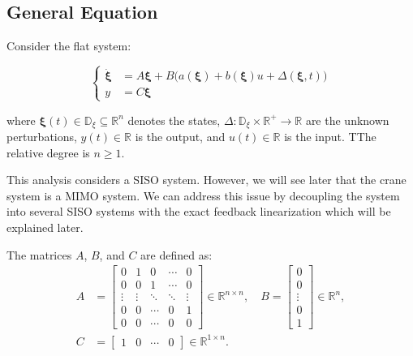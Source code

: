 \subsection{General Equation}

Consider the flat system:

\begin{equation}
    \label{eq:flat_sys_reduced1}
    \left\{
        \begin{aligned}
            \dot{\boldsymbol{\xi}} &= A\boldsymbol{\xi} + B\big(a(\boldsymbol{\xi}) + b(\boldsymbol{\xi})u + \Delta(\boldsymbol{\xi}, t) \big) \\
            y &= C\boldsymbol{\xi}
        \end{aligned}
    \right.
\end{equation}

where \(\boldsymbol{\xi}(t) \in \mathbb{D}_\xi \subseteq \mathbb{R}^n\) denotes the states, 
\(\Delta: \mathbb{D}_{\xi} \times \mathbb{R}^+ \rightarrow \mathbb{R}\) are the unknown 
perturbations, \(y(t) \in \mathbb{R}\) is the output, and \(u(t) \in \mathbb{R}\) is the input. TThe relative degree is \(n \ge 1\).


\begin{remark}
This analysis considers a SISO system. However, we will see later that the crane system is a MIMO system.
We can address this issue by decoupling the system into several SISO systems with the exact feedback linearization
which will be explained later.
\end{remark}

The matrices \(A\), \(B\), and \(C\) are defined as:
\begin{align}
    A &=
    \begin{bmatrix}
    0 & 1 & 0 & \cdots & 0 \\
    0 & 0 & 1 & \cdots & 0 \\
    \vdots & \vdots & \ddots & \ddots & \vdots \\
    0 & 0 & \cdots & 0 & 1 \\
    0 & 0 & \cdots & 0 & 0
    \end{bmatrix}
    \in \mathbb{R}^{n \times n}, \quad
    B =
    \begin{bmatrix}
    0 \\
    0 \\
    \vdots \\
    0 \\
    1
    \end{bmatrix}
    \in \mathbb{R}^n, \\
    C &=
    \begin{bmatrix}
    1 & 0 & \cdots & 0
    \end{bmatrix}
    \in \mathbb{R}^{1 \times n}.
\end{align}

